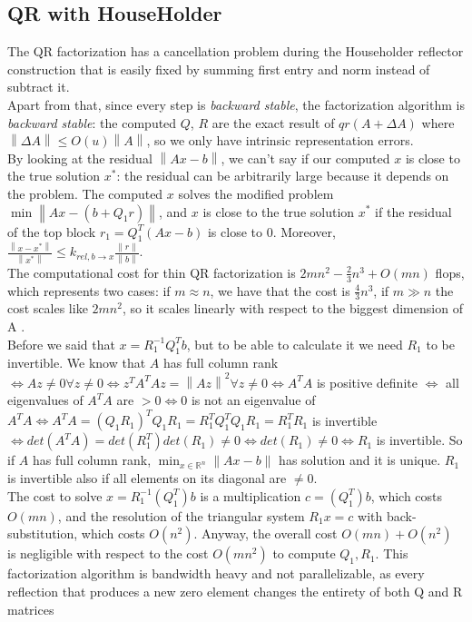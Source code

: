 \documentclass{article}
\begin{document}
\subsection{QR with HouseHolder}\label{subsec:qr-with-householder}
The QR factorization has a cancellation problem during the Householder reflector construction that is easily fixed by summing first entry and norm instead of subtract it.
\\Apart from that, since every step is \textit{backward stable}, the factorization algorithm is \textit{backward stable}: the computed $Q$, $R$ are the exact result of $qr(A + \Delta A)$ where $ \left\lVert \Delta A \right\rVert \leq O(u)\left\lVert A \right\rVert$, so we only have intrinsic representation errors.
\\By looking at the residual $\left\lVert A x - b\right\rVert$, we can't say if our computed $x$ is close to the true solution $x^{*}$: the residual can be arbitrarily large because it depends on the problem.
The computed $x$ solves the modified problem $\min \left\lVert Ax - (b + Q_{1}r)\right\rVert$, and $x$ is close to the true solution $x^{*}$ if the residual of the top block $r_{1} = Q_{1}^{T}(Ax - b)$ is close to 0.
Moreover, $\frac{\left\lVert x - x^{*} \right\rVert}{ \left\lVert x^{*} \right\rVert} \leq k_{rel, b\rightarrow x}\frac{\left\lVert r \right\rVert}{\left\lVert b \right\rVert}$.
\\The computational cost for thin QR factorization is $2mn^2 - \frac{2}{3}n^3 + O(mn)$ flops, which represents two cases: if $m \approx n$, we have that the cost is $\frac{4}{3}n^3$, if $m \gg n$ the cost scales like $2mn^2$, so it scales linearly with respect to the biggest dimension of A .
\\Before we said that $x = R_{1}^{-1}Q_{1}^{T}b$, but to be able to calculate it we need $R_{1}$ to be invertible.
We know that $A$ has full column rank $\iff Az \neq 0 \forall z \neq 0 \iff z^{T}A^{T}Az = \left\lVert Az \right\rVert^{2} \forall z \neq 0 \iff A^{T}A$ is positive definite $\iff$ all eigenvalues of $A^{T}A$ are $> 0\iff $0 is not an eigenvalue of $A^{T}A \iff A^{T}A = (Q_{1}R_{1})^{T}Q_{1}R_{1} = R_{1}^{T}Q_{1}^{T}Q_{1}R_{1} = R_{1}^{T}R_{1}$ is invertible $\iff det(A^{T}A) = det(R_{1}^{T})det(R_{1}) \neq 0 \iff det(R_{1}) \neq 0 \iff R_{1}$ is invertible.
So if $A$ has full column rank, $\min_{x \in \mathds{R}^n}\|Ax-b\|$ has solution and it is unique.
$R_{1}$ is invertible also if all elements on its diagonal are $\neq 0$.
\\The cost to solve $x = R_{1}^{-1}(Q_{1}^{T})b$ is a multiplication $c = (Q_{1}^{T})b$, which costs $O(mn)$, and the resolution of the triangular system $R_{1}x = c$ with back-substitution, which costs $O(n^{2})$.
Anyway, the overall cost $O(mn) + O(n^{2})$ is negligible with respect to the cost $O(mn^{2})$ to compute $Q_{1}, R_{1}$.
This factorization algorithm is bandwidth heavy and not parallelizable, as every reflection that produces a new zero element changes the entirety of both Q and R matrices
\end{document}
